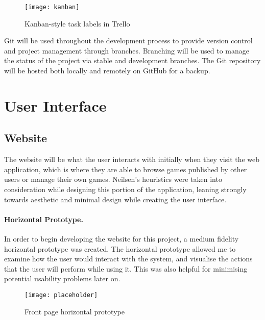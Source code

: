 
\begin{figure}[h]
	\centering
	\texttt{[image: kanban]}
	\caption{Kanban-style task labels in Trello}
	\label{fig:kanban}
\end{figure}


Git will be used throughout the development process to provide version control and project management through branches. Branching will be used to manage the status of the project via stable and development branches. The Git repository will be hosted both locally and remotely on GitHub for a backup.


\section{User Interface}
	\subsection{Website}
	The website will be what the user interacts with initially when they visit the web application, which is where they are able to browse games published by other users or manage their own games. Neilsen's heuristics were taken into consideration while designing this portion of the application, leaning strongly towards aesthetic and minimal design while creating the user interface.


	\paragraph{Horizontal Prototype.}
	In order to begin developing the website for this project, a medium fidelity horizontal prototype was created. The horizontal prototype allowed me to examine how the user would interact with the system, and visualise the actions that the user will perform while using it. This was also helpful for minimising potential usability problems later on.


	\begin{figure}[h]
		\centering
		\texttt{[image: placeholder]}
		\caption{Front page horizontal prototype}
		\label{fig:frontpageprototype}
	\end{figure}

